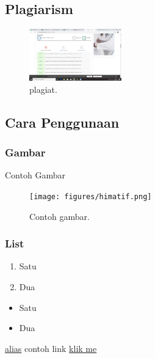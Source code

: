 \subsection{Plagiarism}
\begin{figure}[H]
	\includegraphics[width=4cm]{figures/1174015/plagiat.png}
	\centering
	\caption{plagiat.}
\end{figure}

\subsection{Cara Penggunaan}
\subsubsection{Gambar}

\hfill\break

Contoh Gambar
\begin{figure}[H]
	\texttt{[image: figures/himatif.png]}
	\centering
	\caption{Contoh gambar.}
\end{figure}

\subsubsection{List}
\begin{enumerate}
	\item Satu
	\item Dua
\end{enumerate}

\begin{itemize}
	\item Satu
	\item Dua
\end{itemize}

\href{link kamu}{alias}
contoh link
\href{https://www.google.com/}{klik me}